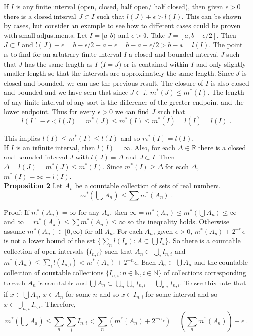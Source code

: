 \documentclass[a4paper]{article}
\begin{document}
If $I$ is any finite interval (open, closed, half open/ half closed), then given $\epsilon > 0$ there is a closed interval $J\subset I$ such that $l(J) + \epsilon > l(I)$. This can be shown by cases, but consider an example to see how to different cases could be proven with small adjustments. Let $I = [a,b)$ and $\epsilon > 0$. Take $J = [a,b-\epsilon/2]$. Then $J \subset I$ and $l(J) + \epsilon = b-\epsilon/2 - a + \epsilon = b-a + \epsilon/2 > b-a = l(I)$. The point is to find for an arbitrary finite interval $I$ a closed and bounded interval $J$ such that $J$ has the same length as $I$ ($I = J$) or is contained within $I$ and only slightly smaller length so that the intervals are approximately the same length. Since $J$ is closed and bounded, we can use the previous result. The closure of $I$ is also closed and bounded and we have seen that since $J\subset I$, $m^*(J) \leq m^*(I)$. The length of any finite interval of any sort is the difference of the greater endpoint and the lower endpoint. Thus for every $\epsilon>0$ we can find $J$ such that 
$$l(I) - \epsilon < l(J) = m^*(J) \leq m^*(I) \leq m^*(\overline{I}) = l(\overline{I}) = l(I) \;.$$

This implies $l(I) \leq m^*(I) \leq l(I)$ and so $m^*(I) = l(I)$. \\

If $I$ is an infinite interval, then $l(I) = \infty$. Also, for each $\Delta \in \mathbb{R}$ there is a closed and bounded interval $J$ with $l(J) = \Delta$ and $J\subset I$. Then $\Delta = l(J) = m^*(J) \leq m^*(I)$. Since $m^*(I) \geq \Delta$ for each $\Delta$, $m^*(I) = \infty = l(I)$. \\

{\bf Proposition 2} Let $A_n$ be a countable collection of sets of real numbers.
$$m^*\left(\bigcup A_n\right) \leq \sum m^*(A_n) \;.$$

Proof: If $m^*(A_n) = \infty$ for any $A_n$, then $\infty = m^*(A_n) \leq m^*\left(\bigcup A_n \right) \leq \infty$ and $\infty  = m^*(A_n) \leq \sum m^*(A_n) \leq \infty$ so the inequality holds. Otherwise assume $m^*(A_n) \in [0,\infty)$ for all $A_n$. For each $A_n$, given $\epsilon > 0$, $m^*(A_n) + 2^{-n}\epsilon$ is not a lower bound of the set $\{\sum_n l(I_n) : A \subset \bigcup I_n\}$. So there is a countable collection of open intervals $\{I_{n,i}\}$ such that $A_n \subset \bigcup_{i} I_{n,i}$ and $m^*(A_n) \leq \sum_{i} l(I_{n,i}) < m^*(A_n) + 2^{-n}\epsilon$. Each $A_n \subset \bigcup A_n$ and the countable collection of countable collections $\{I_{n,i} : n \in \mathbb{N}, i \in \mathbb{N}\}$ of collections corresponding to each $A_n$ is countable and $\bigcup A_n \subset \bigcup_{n} \bigcup_{i} I_{n,i} = \bigcup_{n,i} I_{n,i}$. To see this note that if $x \in \bigcup A_n$, $x \in A_n$ for some $n$ and so $x \in I_{n,i}$ for some interval and so $x \in \bigcup_{n,i} I_{n,i}$. Therefore, 
$$m^*\left(\bigcup A_n \right) \leq \sum_{n} \sum_{i} I_{n,i} < \sum_{n} \left(m^*(A_n) + 2^{-n}\epsilon\right) = \left(\sum_{n} m^*(A_n)\right) + \epsilon\;.$$
\end{document}
